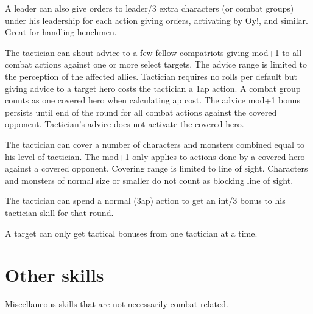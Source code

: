 A leader can also give orders to leader/3 extra characters (or combat groups) under his leadership for each action giving orders, activating by Oy!, and similar. Great for handling henchmen.


 The tactician can shout advice to a few fellow compatriots giving mod+1 to all combat actions against one or more select targets. The advice range is limited to the perception of the affected allies. Tactician requires no rolls per default but giving advice to a target hero costs the tactician a 1ap action. A combat group counts as one covered hero when calculating ap cost. The advice mod+1 bonus persists until end of the round for all combat actions against the covered opponent. Tactician's advice does not activate the covered hero. 

The tactician can cover a number of characters and monsters combined equal to his level of tactician. The mod+1 only applies to actions done by a covered hero against a covered opponent. Covering range is limited to line of sight. Characters and monsters of normal size or smaller do not count as blocking line of sight.

The tactician can spend a normal (3ap) action to get an int/3 bonus to his tactician skill for that round.

A target can only get tactical bonuses from one tactician at a time.




\closeskillslist
















\section*{Other skills}

Miscellaneous skills that are not necessarily combat related.



